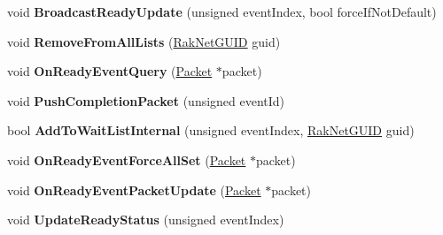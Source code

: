 \begin{DoxyCompactItemize}
\item 
\hypertarget{class_rak_net_1_1_ready_event_aa784fad9f99f90b3d4e7d72153eaf712}{void {\bfseries Broadcast\-Ready\-Update} (unsigned event\-Index, bool force\-If\-Not\-Default)}\label{class_rak_net_1_1_ready_event_aa784fad9f99f90b3d4e7d72153eaf712}

\item 
\hypertarget{class_rak_net_1_1_ready_event_a4126e3410ab430297b182653cf03e05b}{void {\bfseries Remove\-From\-All\-Lists} (\hyperlink{struct_rak_net_1_1_rak_net_g_u_i_d}{Rak\-Net\-G\-U\-I\-D} guid)}\label{class_rak_net_1_1_ready_event_a4126e3410ab430297b182653cf03e05b}

\item 
\hypertarget{class_rak_net_1_1_ready_event_a9658d9187e653e6a70ca787c5fe35b00}{void {\bfseries On\-Ready\-Event\-Query} (\hyperlink{struct_rak_net_1_1_packet}{Packet} $\ast$packet)}\label{class_rak_net_1_1_ready_event_a9658d9187e653e6a70ca787c5fe35b00}

\item 
\hypertarget{class_rak_net_1_1_ready_event_a17b7637767ad847de415a70663c13ade}{void {\bfseries Push\-Completion\-Packet} (unsigned event\-Id)}\label{class_rak_net_1_1_ready_event_a17b7637767ad847de415a70663c13ade}

\item 
\hypertarget{class_rak_net_1_1_ready_event_a3d97deca0ae33e0fe3c18d905ac6a0fd}{bool {\bfseries Add\-To\-Wait\-List\-Internal} (unsigned event\-Index, \hyperlink{struct_rak_net_1_1_rak_net_g_u_i_d}{Rak\-Net\-G\-U\-I\-D} guid)}\label{class_rak_net_1_1_ready_event_a3d97deca0ae33e0fe3c18d905ac6a0fd}

\item 
\hypertarget{class_rak_net_1_1_ready_event_a34f4121e1aeb135923a0ca76a6e0ef67}{void {\bfseries On\-Ready\-Event\-Force\-All\-Set} (\hyperlink{struct_rak_net_1_1_packet}{Packet} $\ast$packet)}\label{class_rak_net_1_1_ready_event_a34f4121e1aeb135923a0ca76a6e0ef67}

\item 
\hypertarget{class_rak_net_1_1_ready_event_ac1a05938224ae827285eacfc9648e8c5}{void {\bfseries On\-Ready\-Event\-Packet\-Update} (\hyperlink{struct_rak_net_1_1_packet}{Packet} $\ast$packet)}\label{class_rak_net_1_1_ready_event_ac1a05938224ae827285eacfc9648e8c5}

\item 
\hypertarget{class_rak_net_1_1_ready_event_a4183346192b955a648d5f5a0109fdbed}{void {\bfseries Update\-Ready\-Status} (unsigned event\-Index)}\label{class_rak_net_1_1_ready_event_a4183346192b955a648d5f5a0109fdbed}


\end{DoxyCompactItemize}
